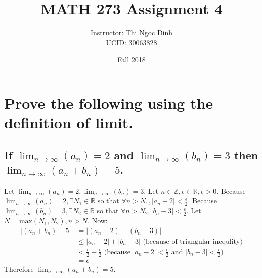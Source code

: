 \documentclass[10pt, letterpaper, titlepage]{article}
\title{MATH 273 Assignment 4}
\author{Instructor: Thi Ngoc Dinh
    \\UCID: 30063828}
\date{Fall 2018}
\newcommand{\0}{\varnothing}
\newcommand{\Z}{\mathbb{Z}}
\newcommand{\R}{\mathbb{R}}
\newcommand\abs[1]{\left|#1\right|}
\newcommand{\lntinf}{\lim_{n \to \infty}}
\newcommand{\1}{\{ 1 \}}
\newcommand{\2}{\{ (1,1) \}}
\newcommand{\e}{\epsilon}
\newcommand{\an}{a_n}
\newcommand{\bn}{b_n}
\begin{document}
    \maketitle

    \section{Prove the  following using the definition of limit.}
        \subsection{If $\lntinf (a_n) = 2$ and $\lntinf (b_n) = 3$ then $\lntinf (a_n + b_n ) = 5$.}
            Let $\lntinf (\an) = 2, \lntinf (\bn) = 3$. Let $n \in \Z, \e \in \R, \e > 0$.
            Because $\lntinf (\an) = 2, \exists N_1 \in \R$ so that $\forall n > N_1, \abs{\an - 2} < \frac{\e}{2}$.
            Because $\lntinf (\bn) = 3, \exists N_2 \in \R$ so that $\forall n > N_2, \abs{\bn - 3} < \frac{\e}{2}$.
            Let $N = \text{max}(N_1, N_2), n > N$.
            Now:
            \begin{align*}
            \abs{(\an + \bn) -5} &= \abs{(\an - 2) + (\bn - 3)} \\
            &\leq \abs{\an - 2} + \abs{\bn - 3} \text{ (because of triangular inequlity)}\\
            &< \frac{\e}{2} + \frac{\e}{2} \text{ (because $\abs{\an - 2} < \frac{\e}{2}$ and $\abs{\bn - 3} < \frac{\e}{2}$)}\\
            &= \e
            \end{align*}
            Therefore $\lntinf (\an + \bn) =5$.
\end{document}
